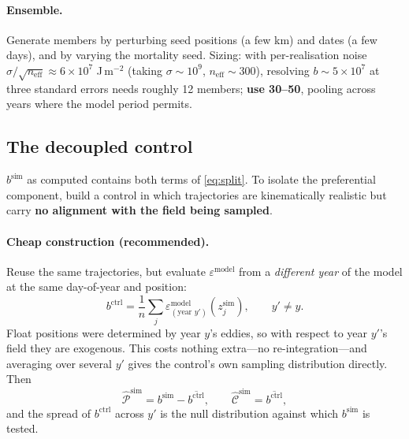 \documentclass[11pt]{article}
\begin{document}
\paragraph{Ensemble.} Generate members by perturbing seed positions (a few km) and dates (a few
days), and by varying the mortality seed. Sizing: with per-realisation noise
$\sigma/\sqrt{n_{\text{eff}}} \approx 6\times10^{7}$ J\,m$^{-2}$ (taking $\sigma \sim 10^{9}$,
$n_{\text{eff}} \sim 300$), resolving $b \sim 5\times10^{7}$ at three standard errors needs
roughly 12 members; \textbf{use 30--50}, pooling across years where the model period permits.

\subsection{The decoupled control}
\label{sec:control}

$b^{\text{sim}}$ as computed contains both terms of \eqref{eq:split}. To isolate the
preferential component, build a control in which trajectories are kinematically realistic but
carry \textbf{no alignment with the field being sampled}.

\paragraph{Cheap construction (recommended).} Reuse the same trajectories, but evaluate
$\varepsilon^{\text{model}}$ from a \emph{different year} of the model at the same day-of-year
and position:
\begin{equation}
  b^{\text{ctrl}} = \frac{1}{n}\sum_j \varepsilon^{\text{model}}_{(\text{year } y')}(z_j^{\text{sim}}),
  \qquad y' \neq y .
\end{equation}
Float positions were determined by year $y$'s eddies, so with respect to year $y'$'s field they
are exogenous. This costs nothing extra---no re-integration---and averaging over several $y'$
gives the control's own sampling distribution directly. Then
\begin{equation}
  \widehat{\mathcal{P}}^{\text{sim}} = b^{\text{sim}} - \overline{b^{\text{ctrl}}},
  \qquad
  \widehat{\mathcal{C}}^{\text{sim}} = \overline{b^{\text{ctrl}}},
\end{equation}
and the spread of $b^{\text{ctrl}}$ across $y'$ is the null distribution against which
$b^{\text{sim}}$ is tested.
\end{document}
